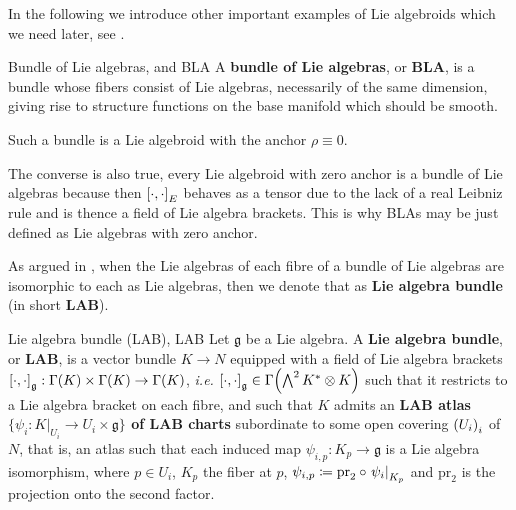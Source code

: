 In the following we introduce other important examples of Lie algebroids which we need later, see \cite[\S 16.2]{DaSilva}.

\begin{examples}{Bundle of Lie algebras, \newline \cite[\S 16.2, Example 2; page 114]{DaSilva} and \cite[\S 16.3; page 116f.]{DaSilva}}{BLA}
A \textbf{bundle of Lie algebras}, or \textbf{\gls{BLA}}, is a bundle whose fibers consist of Lie algebras, necessarily of the same dimension, giving rise to structure functions on the base manifold which should be smooth.
	
Such a bundle is a Lie algebroid with the anchor $\rho \equiv 0$.
	
The converse is also true, every Lie algebroid with zero anchor is a bundle of Lie algebras because then $\mleft[ \cdot, \cdot  \mright]_E$ behaves as a tensor due to the lack of a real Leibniz rule and is thence a field of Lie algebra brackets. This is why BLAs may be just defined as Lie algebras with zero anchor.
\end{examples}

As argued in \cite[Theorem 6.4.5; page 238f.]{mackenzieGeneralTheory}, when the Lie algebras of each fibre of a bundle of Lie algebras are isomorphic to each as Lie algebras, then we denote that as \textbf{Lie algebra bundle} (in short \textbf{LAB}).

\begin{definitions}{Lie algebra bundle (LAB), \cite[Definition 3.3.8; page 104]{mackenzieGeneralTheory}}{LAB}
Let $\mathfrak{g}$ be a Lie algebra. A \textbf{Lie algebra bundle}, or \textbf{\gls{LAB}}, is a vector bundle $K \to N$ equipped with a field of Lie algebra brackets $\mleft[ \cdot, \cdot \mright]_{\mathfrak{g}}: \Gamma(K) \times \Gamma(K) \to \Gamma(K)$, \textit{i.e.} $\mleft[ \cdot, \cdot \mright]_{\mathfrak{g}} \in \Gamma\mleft(\bigwedge^2 K^* \otimes K \mright)$ such that it restricts to a Lie algebra bracket on each fibre, and such that $K$ admits an \textbf{LAB atlas $\{ \psi_i: K|_{U_i} \to U_i \times \mathfrak{g} \}$ of LAB charts} subordinate to some open covering $\mleft( U_i \mright)_i$ of $N$, that is, an atlas such that each induced map $\psi_{i, p}: K_p \to \mathfrak{g}$ is a Lie algebra isomorphism, where $p \in U_i$, $K_p$ the fiber at $p$, $\psi_{i, p} \coloneqq \mathrm{pr}_2 \circ \mleft.\psi_i\mright|_{K_p}$ and $\mathrm{pr}_2$ is the projection onto the second factor.
\end{definitions}

